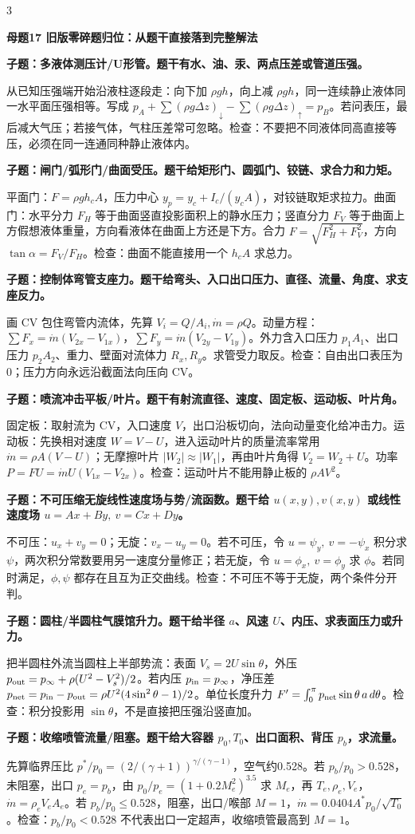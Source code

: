 \documentclass[a4paper]{article}
\newcommand{\mt}[1]{\vspace{0.22pt}\colorbox{M}{\parbox{\dimexpr\linewidth-2\fboxsep}{\color{white}\bfseries #1}}\par}
\newcommand{\qt}[1]{\vspace{0.10pt}\colorbox{Q}{\parbox{\dimexpr\linewidth-2\fboxsep}{\color{white}\bfseries #1}}\par}
\newcommand{\ans}[1]{\colorbox{G}{\parbox{\dimexpr\linewidth-2\fboxsep}{#1}}\par}
\begin{document}
\begin{multicols}{3}
\mt{母题17 旧版零碎题归位：从题干直接落到完整解法}
\qt{子题：多液体测压计/U形管。题干有水、油、汞、两点压差或管道压强。}
\ans{从已知压强端开始沿液柱逐段走：向下加 $\rho gh$，向上减 $\rho gh$，同一连续静止液体同一水平面压强相等。写成 $p_A+\sum(\rho g\Delta z)_{\downarrow}-\sum(\rho g\Delta z)_{\uparrow}=p_B$。若问表压，最后减大气压；若接气体，气柱压差常可忽略。检查：不要把不同液体同高直接等压，必须在同一连通同种静止液体内。}
\qt{子题：闸门/弧形门/曲面受压。题干给矩形门、圆弧门、铰链、求合力和力矩。}
\ans{平面门：$F=\rho gh_cA$，压力中心 $y_p=y_c+I_c/(y_cA)$，对铰链取矩求拉力。曲面门：水平分力 $F_H$ 等于曲面竖直投影面积上的静水压力；竖直分力 $F_V$ 等于曲面上方假想液体重量，方向看液体在曲面上方还是下方。合力 $F=\sqrt{F_H^2+F_V^2}$，方向 $\tan\alpha=F_V/F_H$。检查：曲面不能直接用一个 $h_cA$ 求总力。}
\qt{子题：控制体弯管支座力。题干给弯头、入口出口压力、直径、流量、角度、求支座反力。}
\ans{画 CV 包住弯管内流体，先算 $V_i=Q/A_i,\dot m=\rho Q$。动量方程：$\sum F_x=\dot m(V_{2x}-V_{1x})$，$\sum F_y=\dot m(V_{2y}-V_{1y})$。外力含入口压力 $p_1A_1$、出口压力 $p_2A_2$、重力、壁面对流体力 $R_x,R_y$。求管受力取反。检查：自由出口表压为0；压力方向永远沿截面法向压向 CV。}
\qt{子题：喷流冲击平板/叶片。题干有射流直径、速度、固定板、运动板、叶片角。}
\ans{固定板：取射流为 CV，入口速度 $V$，出口沿板切向，法向动量变化给冲击力。运动板：先换相对速度 $W=V-U$，进入运动叶片的质量流率常用 $\dot m=\rho A(V-U)$；无摩擦叶片 $|W_2|\approx |W_1|$，再由叶片角得 $V_2=W_2+U$。功率 $P=FU=\dot mU(V_{1x}-V_{2x})$。检查：运动叶片不能用静止板的 $\rho AV^2$。}
\qt{子题：不可压缩无旋线性速度场与势/流函数。题干给 $u(x,y),v(x,y)$ 或线性速度场 $u=Ax+By,\ v=Cx+Dy$。}
\ans{不可压：$u_x+v_y=0$；无旋：$v_x-u_y=0$。若不可压，令 $u=\psi_y,\ v=-\psi_x$ 积分求 $\psi$，两次积分常数要用另一速度分量修正；若无旋，令 $u=\phi_x,\ v=\phi_y$ 求 $\phi$。若同时满足，$\phi,\psi$ 都存在且互为正交曲线。检查：不可压不等于无旋，两个条件分开判。}
\qt{子题：圆柱/半圆柱气膜馆升力。题干给半径 $a$、风速 $U$、内压、求表面压力或升力。}
\ans{把半圆柱外流当圆柱上半部势流：表面 $V_s=2U\sin\theta$，外压 $p_{\rm out}=p_\infty+\rho(U^2-V_s^2)/2$。若内压 $p_{\rm in}=p_\infty$，净压差 $p_{\rm net}=p_{\rm in}-p_{\rm out}=\rho U^2(4\sin^2\theta-1)/2$。单位长度升力 $F'=\int_0^\pi p_{\rm net}\sin\theta\,a\,d\theta$。检查：积分投影用 $\sin\theta$，不是直接把压强沿竖直加。}
\qt{子题：收缩喷管流量/阻塞。题干给大容器 $p_0,T_0$、出口面积、背压 $p_b$，求流量。}
\ans{先算临界压比 $p^*/p_0=(2/(\gamma+1))^{\gamma/(\gamma-1)}$，空气约0.528。若 $p_b/p_0>0.528$，未阻塞，出口 $p_e=p_b$，由 $p_0/p_e=(1+0.2M_e^2)^{3.5}$ 求 $M_e$，再 $T_e,\rho_e,V_e$，$\dot m=\rho_eV_eA_e$。若 $p_b/p_0\le0.528$，阻塞，出口/喉部 $M=1$，$\dot m=0.0404A^*p_0/\sqrt{T_0}$。检查：$p_b/p_0<0.528$ 不代表出口一定超声，收缩喷管最高到 $M=1$。}

\end{multicols}
\end{document}
